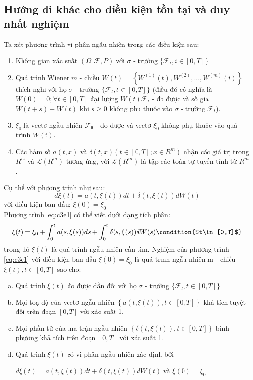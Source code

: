 \documentclass[14pt,a4paper]{article}
\numberwithin{equation}{section}
\begin{document}
\subsection{Hướng đi khác cho điều kiện tồn tại và duy nhất nghiệm}
Ta xét phương trình vi phân ngẫu nhiên trong các điều kiện sau:
\begin{enumerate}[(1)]
	\item Không gian xác suất $(\Omega,\mathscr{F},P)$ với $\sigma$ - trường $\{\mathscr{F}_t,i\in [0,T]\}$
	\item Quá trình Wiener $m$ - chiều $W(t)=\left\{W^{(1)}(t),W^{(2)},...,W^{(m)}(t) \right\}$ thích nghi với họ $\sigma$ - trường $\{\mathscr{F}_t,t\in [0,T] \}$ (điều đó có nghĩa là $W(0)=0;\forall t\in[0,T]$ đại lượng $W(t)\mathscr{F}_t$ - đo được và số gia $W(t+s)-W(t)$ khi $s\geq0$ không phụ thuộc vào $\sigma$ - trường $\mathscr{F}_t$).
	\item $\xi_0$ là vectơ ngẫu nhiên $\mathscr{F}_0$ - đo được và vectơ $\xi_0$ không phụ thuộc vào quá trình $W(t)$.
	\item Các hàm số $a(t,x)$ và $\delta(t,x)\left(t\in [0,T];x\in R^m \right)$ nhận các giá trị trong $R^m$ và $\mathscr{L}(R^m)$ tương ứng, với $\mathscr{L}(R^m)$ là tập các toán tự tuyến tính từ $R^m$.\\
\end{enumerate}
Cụ thể với phương trình như sau:
\begin{equation}\label{eq:c3e1}
	d\xi(t)=a(t,\xi(t))dt+\delta(t,\xi(t))dW(t)
\end{equation}
với điều kiện ban đầu: $\xi(0)=\xi_0$\\
Phương trình \eqref{eq:c3e1} có thể viết dưới dạng tích phân:
\begin{equation*}
	\xi(t)=\xi_0+\int_{0}^{t}a(s,\xi(s))ds+\int_{0}^{t}\delta(s,\xi(s))dW(s) \condition{$t\in[0,T]$}
\end{equation*}
trong đó $\xi(t)$ là quá trình ngẫu nhiên cần tìm. Nghiệm của phương trình \eqref{eq:c3e1} với điều kiện ban đầu $\xi(0)=\xi_0$ là quá trình ngẫu nhiên m - chiều $\xi(t),t\in[0,T]$ sao cho:\\
\begin{enumerate}[a)]
	\item Quá trình $\xi(t)$ đo được dần đối với họ $\sigma$ - trường $\{\mathscr{F}_t,t\in[0,T]\}$
	\item Mọi toạ độ của vectơ ngẫu nhiên $\left\{a(t,\xi(t)),t\in[0,T] \right\}$ khả tích tuyệt đối trên đoạn $[0,T]$ với xác suất 1.
	\item Mọi phần tử của ma trận ngẫu nhiên $\left\{\delta(t,\xi(t)),t\in[0,T] \right\}$ bình phương khả tích trên đoạn $[0,T]$ với xác suất 1.
	\item Quá trình $\xi(t)$ có vi phân ngẫu nhiên xác định bởi 
\begin{center}
	$d\xi(t)=a(t,\xi(t))dt+\delta(t,\xi(t))dW(t)$ và $\xi(0)=\xi_0$
\end{center}
\end{enumerate}
\end{document}
